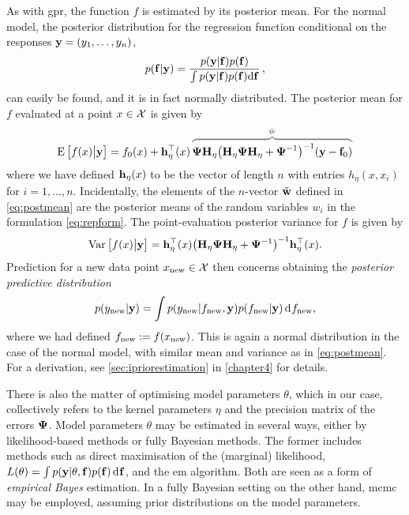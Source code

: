 \documentclass[11pt,twoside,openright,showframe]{report}
\begin{document}
As with \gls*{gpr}, the function $f$ is estimated by its posterior mean.
For the normal model, the posterior distribution for the regression function conditional on the responses ${\mathbf y} = (y_1,\dots,y_n)$,
%
\begin{equation}
  p({\mathbf f}|{\mathbf y}) = \frac{p({\mathbf y}|{\mathbf f})p({\mathbf f})}{\int p({\mathbf y}|{\mathbf f})p({\mathbf f}) \text{d} {\mathbf f}} \, ,
\end{equation}
%
can easily be found, and it is in fact normally distributed.
The posterior mean for $f$ evaluated at a point $x \in {\mathcal X}$ is given by
%
\begin{equation}\label{eq:postmean}
  \E\big[f(x)\big|\by\big] 
  = f_0(x) + \bh_\eta^\top(x) \,
  \myoverbrace{\bPsi\bH_\eta \big(\bH_\eta\bPsi\bH_\eta + \bPsi^{-1}\big)^{-1} (\by -\bff_0 )}{\tilde \bw}
\end{equation}
%
where we have defined ${\mathbf h}_\eta(x)$ to be the vector of length $n$ with entries $h_\eta(x,x_i)$ for $i=1,\dots,n$.
Incidentally, the elements of the $n$-vector $\tilde {{\mathbf w}}$ defined in \cref{eq:postmean} are the posterior means of the random variables $w_i$ in the formulation \cref{eq:repform}.
The point-evaluation posterior variance for $f$ is given by
%
\begin{align}\label{eq:postvar}
  \operatorname{Var}\big[f(x)\big|{\mathbf y}\big] = {\mathbf h}_\eta^\top(x)\big( {\mathbf H}_\eta{\bm\Psi}{\mathbf H}_\eta + {\bm\Psi}^{-1} \big)^{-1} {\mathbf h}_\eta^\top(x).
\end{align}
%
Prediction for a new data point $x_{\text{new}} \in {\mathcal X}$ then concerns obtaining the \emph{posterior predictive distribution}
%
\[
  p(y_{\text{new}}|{\mathbf y}) = \int p(y_{\text{new}}|f_{\text{new}},{\mathbf y})p(f_{\text{new}}|{\mathbf y}) \operatorname{d}\hspace{0.5pt}\! f_{\text{new}},
\]
%
where we had defined $f_{\text{new}} := f(x_{\text{new}})$.
This is again a normal distribution in the case of the normal model, with similar mean and variance as in \cref{eq:postmean}. 
For a derivation, see \cref{sec:ipriorestimation} in \cref{chapter4} for details.


There is also the matter of optimising model parameters $\theta$, which in our case, collectively refers to the kernel parameters $\eta$ and the precision matrix of the errors ${\bm\Psi}$.
Model parameters $\theta$ may be estimated in several ways, either by likelihood-based methods or fully Bayesian methods.
The former includes methods such as direct maximisation of the (marginal) likelihood, $L(\theta) = \int p({\mathbf y}|\theta,{\mathbf f})p({\mathbf f})\operatorname{d}\hspace{0.5pt}\! {\mathbf f}$, and the \gls*{em} algorithm.
Both are seen as a form of \emph{empirical Bayes} estimation.
In a fully Bayesian setting on the other hand, \gls*{mcmc} may be employed, assuming prior distributions on the model parameters.
\end{document}
